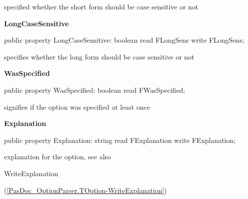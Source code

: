 \documentclass{report}
\newif\ifpdf
\begin{document}
\begin{list}{}
\begin{flushleft}
\ifpdf
\end{flushleft}
\fi


\par specified whether the short form should be case sensitive or not\label{PasDoc_OptionParser.TOption-LongCaseSensitive}
\item[\textbf{LongCaseSensitive}\hfill]
\ifpdf
\begin{flushleft}
\fi
\begin{ttfamily}
public property LongCaseSensitive: boolean read FLongSens write FLongSens;\end{ttfamily}

\ifpdf
\end{flushleft}
\fi


\par specifies whether the long form should be case sensitive or not\label{PasDoc_OptionParser.TOption-WasSpecified}
\item[\textbf{WasSpecified}\hfill]
\ifpdf
\begin{flushleft}
\fi
\begin{ttfamily}
public property WasSpecified: boolean read FWasSpecified;\end{ttfamily}

\ifpdf
\end{flushleft}
\fi


\par signifies if the option was specified at least once\label{PasDoc_OptionParser.TOption-Explanation}
\item[\textbf{Explanation}\hfill]
\ifpdf
\begin{flushleft}
\fi
\begin{ttfamily}
public property Explanation: string read FExplanation write FExplanation;\end{ttfamily}

\ifpdf
\end{flushleft}
\fi


\par explanation for the option, see also \begin{ttfamily}WriteExplanation\end{ttfamily}(\ref{PasDoc_OptionParser.TOption-WriteExplanation})\end{list}
\end{document}
